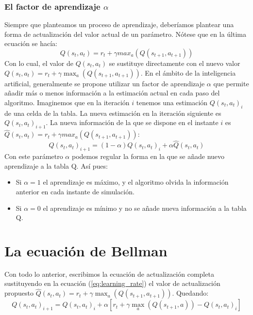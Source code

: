 \documentclass{article}
\begin{document}
\begin{itemize}
\subsubsection{El factor de aprendizaje $\alpha$}
Siempre que planteamos un proceso de aprendizaje, deberíamos plantear una forma de actualización del valor actual de un parámetro. Nótese que en la última ecuación se hacía:
\begin{equation*}
Q(s_t,a_t) = r_t + \gamma 
max_a(Q(s_{t+1},a_{t+1}))
\end{equation*}
Con lo cual, el valor de $Q(s_t,a_t)$ se sustituye directamente con el nuevo valor $Q(s_t,a_t) = r_t + \gamma 
\max_a(Q(s_{t+1},a_{t+1}))$. En el ámbito de la inteligencia artificial, generalmente se propone utilizar un factor de aprendizaje $\alpha$ que permite añadir más o menos información a la estimación actual en cada paso del algoritmo. Imaginemos que en la iteración $i$ tenemos una estimación $Q(s_t,a_t)_i$ de una celda de la tabla. La nueva estimación en la iteración siguiente es $Q(s_t,a_t)_{i+1}$. La nueva información de la que se dispone en el instante $i$ es $\hat{Q}(s_t,a_t) = r_t + \gamma 
max_a(Q(s_{t+1},a_{t+1}))$:
\begin{equation}\label{eq:learning_rate}
Q(s_t,a_t)_{i+1} = (1-\alpha) Q(s_t,a_t)_{i} + \alpha \hat{Q}(s_t,a_t)
\end{equation}
Con este parámetro $\alpha$ podemos regular la forma en la que se añade nuevo aprendizaje a la tabla Q. Así pues:
\begin{itemize}
    \item Si $\alpha=1$ el aprendizaje es máximo, y el algoritmo olvida la información anterior en cada instante de simulación.
    \item Si $\alpha=0$ el aprendizaje es mínimo y no se añade nueva información a la tabla Q.
\end{itemize}

\section{La ecuación de Bellman}
Con todo lo anterior, escribimos la ecuación de actualización completa sustituyendo en la ecuación (\ref{eq:learning_rate}) el valor de actualización propuesto $\hat{Q}(s_t,a_t) = r_t + \gamma 
\max_a(Q(s_{t+1},a_{t+1}))$. Quedando:
\begin{equation}
Q(s_t,a_t)_{i+1} = Q(s_t,a_t)_{i} + \alpha [r_t + \gamma 
\max_a(Q(s_{t+1},a))- Q(s_t,a_t)_{i}]    
\end{equation}


\end{itemize}
\end{document}
